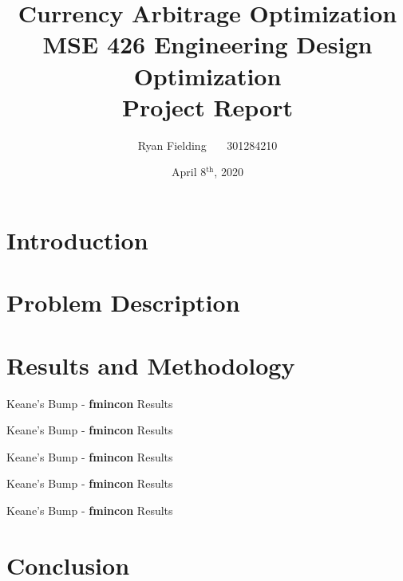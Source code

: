 \documentclass[12pt]{article}
\author{Ryan Fielding \ \ \ 301284210}
\title{\textbf{Currency Arbitrage Optimization\\}
\bigskip
\bigskip
MSE 426 Engineering Design Optimization\\Project Report
}
\date{April 8$^{\text{th}}$, 2020}
\begin{document}
\maketitle
\newpage
\tableofcontents
\newpage
\listoffigures
\listoftables
\newpage

\section{Introduction}


\section{Problem Description}


\section{Results and Methodology}

\begin{table}[H]
    \centering
    
    \caption{Keane's Bump - \textbf{fmincon} Results}
    \label{tab:bumpFM}
\end{table}

\begin{table}[H]
    \centering
    
    \caption{Keane's Bump - \textbf{fmincon} Results}
    \label{tab:bumpFM}
\end{table}

\begin{table}[H]
    \centering
    
    \caption{Keane's Bump - \textbf{fmincon} Results}
    \label{tab:bumpFM}
\end{table}

\begin{table}[H]
    \centering
    
    \caption{Keane's Bump - \textbf{fmincon} Results}
    \label{tab:bumpFM}
\end{table}

\begin{table}[H]
    \centering
    
    \caption{Keane's Bump - \textbf{fmincon} Results}
    \label{tab:bumpFM}
\end{table}



\section{Conclusion}


\newpage
\nocite{*}


\end{document}
